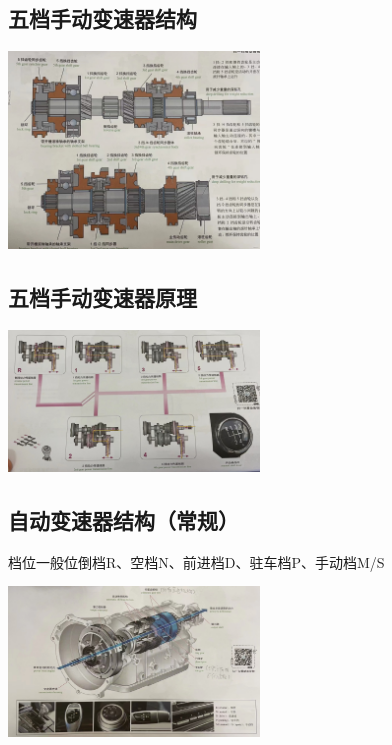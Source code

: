 	\subsection{五档手动变速器结构}
		\begin{center}
			\includegraphics[width=0.5\textwidth]{3-13}
		\end{center}
	\subsection{五档手动变速器原理}
			\begin{center}
				\includegraphics[width=0.5\textwidth]{3-14}
			\end{center}
	\subsection{自动变速器结构（常规）}
		档位一般位倒档R、空档N、前进档D、驻车档P、手动档M/S
		\begin{center}
			\includegraphics[width=0.5\textwidth]{3-15}
		\end{center}
